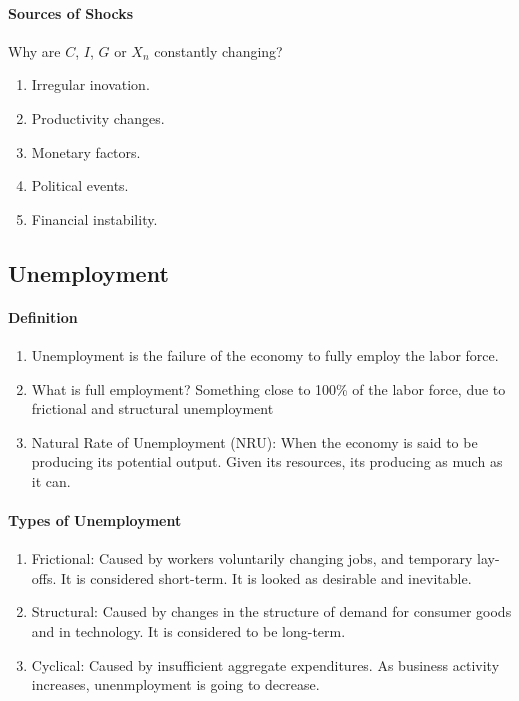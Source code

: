 \paragraph{Sources of Shocks} Why are $C$, $I$, $G$ or $X_n$ constantly changing?

\begin{enumerate}
	\item Irregular inovation.

	\item Productivity changes.

	\item Monetary factors.

	\item Political events.

	\item Financial instability.

\end{enumerate}

\subsection{Unemployment}

\paragraph{Definition} 
\begin{enumerate}
	\item Unemployment is the failure of the economy to fully employ the labor force.


	\item What is full employment? Something close to 100\% of the labor force, due to frictional and structural unemployment

	\item Natural Rate of Unemployment (NRU): When the economy is said to be producing its potential output. Given its resources, its producing as much as it can.
	
\end{enumerate}

\paragraph{Types of Unemployment}

\begin{enumerate}
	\item Frictional:
		Caused by workers voluntarily changing jobs, and temporary lay-offs. It is considered short-term. It is looked as desirable and inevitable.

	\item Structural:
		Caused by changes in the structure of demand for consumer goods and in technology. It is considered to be long-term.

	\item Cyclical:
		Caused by insufficient aggregate expenditures. As business activity increases, unenmployment is going to decrease. 
\end{enumerate}

